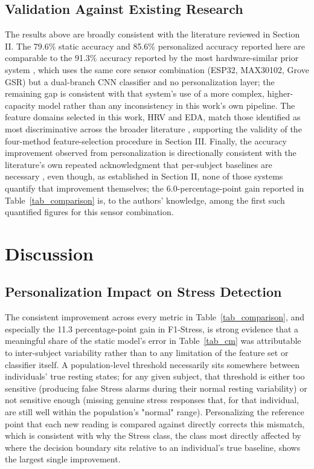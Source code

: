 \documentclass[conference]{IEEEtran}
\begin{document}
\subsection{Validation Against Existing Research}
The results above are broadly consistent with the literature
reviewed in Section II. The 79.6\% static accuracy and 85.6\%
personalized accuracy reported here are comparable to the
91.3\% accuracy reported by the most hardware-similar prior
system \cite{b10}, which uses the same core sensor combination
(ESP32, MAX30102, Grove GSR) but a dual-branch CNN classifier
and no personalization layer; the remaining gap is consistent
with that system's use of a more complex, higher-capacity
model rather than any inconsistency in this work's own
pipeline. The feature domains selected in this work, HRV and
EDA, match those identified as most discriminative across the
broader literature \cite{b1}\cite{b2}\cite{b5}\cite{b7}\cite{b12},
supporting the validity of the four-method feature-selection
procedure in Section III. Finally, the accuracy improvement
observed from personalization is directionally consistent
with the literature's own repeated acknowledgment that
per-subject baselines are necessary
\cite{b6}\cite{b8}\cite{b9}\cite{b11}, even though, as
established in Section II, none of those systems quantify
that improvement themselves; the 6.0-percentage-point gain
reported in Table~\ref{tab_comparison} is, to the authors'
knowledge, among the first such quantified figures for this
sensor combination.

\section{Discussion}

\subsection{Personalization Impact on
Stress Detection}
The consistent improvement across every metric in
Table~\ref{tab_comparison}, and especially the 11.3
percentage-point gain in F1-Stress, is strong evidence that a
meaningful share of the static model's error in
Table~\ref{tab_cm} was attributable to inter-subject
variability rather than to any limitation of the feature set
or classifier itself. A population-level threshold necessarily
sits somewhere between individuals' true resting states; for
any given subject, that threshold is either too sensitive
(producing false Stress alarms during their normal resting
variability) or not sensitive enough (missing genuine stress
responses that, for that individual, are still well within the
population's "normal" range). Personalizing the reference point
that each new reading is compared against directly corrects
this mismatch, which is consistent with why the Stress class,
the class most directly affected by where the decision boundary
sits relative to an individual's true baseline, shows the
largest single improvement.
\end{document}
